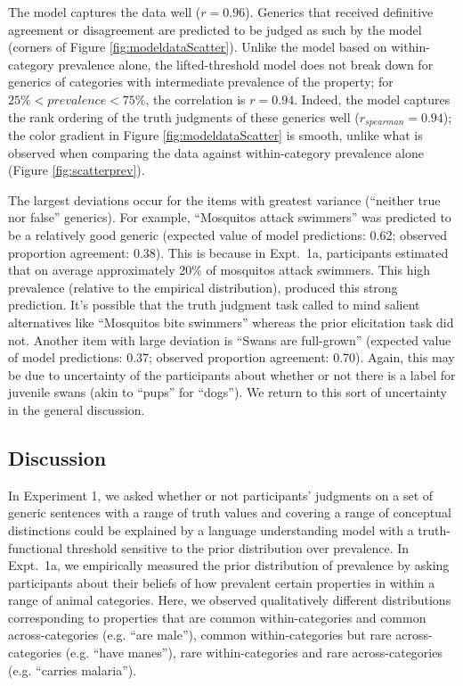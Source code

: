 \documentclass[10pt,letterpaper]{article}
\begin{document}
The model captures the data well ($r=0.96$). Generics that received definitive agreement or disagreement are predicted to be judged as such by the model (corners of Figure \ref{fig:modeldataScatter}). Unlike the model based on within-category prevalence alone, the lifted-threshold model does not break down for generics of categories with intermediate prevalence of the property; for $ 25\% < prevalence < 75\%$, the correlation is $r=0.94$. Indeed, the model captures the rank ordering of the truth judgments of these generics well ($r_{spearman} = 0.94$); the color gradient in Figure \ref{fig:modeldataScatter} is smooth, unlike what is observed when comparing the data against within-category prevalence alone (Figure \ref{fig:scatterprev}). 

The largest deviations occur for the items with greatest variance (``neither true nor false'' generics). For example, ``Mosquitos attack swimmers'' was predicted to be a relatively good generic (expected value of model predictions: 0.62; observed proportion agreement: 0.38). This is because in Expt.~1a, participants estimated that on average approximately 20\% of mosquitos attack swimmers. This high prevalence (relative to the empirical distribution), produced this strong prediction. It's possible that the truth judgment task called to mind salient alternatives like ``Mosquitos bite swimmers'' whereas the prior elicitation task did not. Another item with large deviation is ``Swans are full-grown'' (expected value of model predictions: 0.37; observed proportion agreement: 0.70). Again, this may be due to uncertainty of the participants about whether or not there is a label for juvenile swans (akin to ``pups'' for ``dogs''). We return to this sort of uncertainty in the general discussion.


\subsection{Discussion}

In Experiment 1, we asked whether or not participants' judgments on a set of generic sentences with a range of truth values and covering a range of conceptual distinctions could be explained by a language understanding model with a truth-functional threshold sensitive to the prior distribution over prevalence. In Expt.~1a, we empirically measured the prior distribution of prevalence by asking participants about their beliefs of how prevalent certain properties in within a range of animal categories. Here, we observed qualitatively different distributions corresponding to properties that are common within-categories and common across-categories (e.g. ``are male''), common within-categories but rare across-categories (e.g. ``have manes''), rare within-categories and rare across-categories (e.g. ``carries malaria''). 
\end{document}
